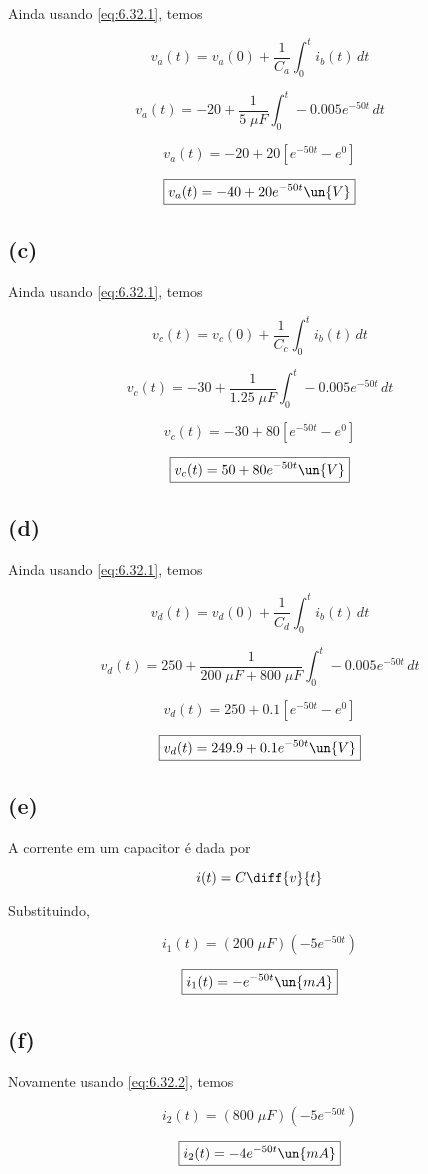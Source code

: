 Ainda usando \eqref{eq:6.32.1}, temos 

\[ v_a(t) = v_a(0) + \frac{1}{C_{a}} \int_{0}^{t} i_b(t) \,dt \]

\[ v_a(t) = -20 + \frac{1}{5 \;\mu F} \int_{0}^{t} -0.005e^{-50t} \,dt \]

\[ v_a(t) = -20 + 20 \left[e^{-50t} - e^0\right] \]

\[ \boxed{v_a(t) = -40 + 20e^{-50t} \un{V}}  \]

\subsection*{(c)}

Ainda usando \eqref{eq:6.32.1}, temos 

\[ v_c(t) = v_c(0) + \frac{1}{C_{c}} \int_{0}^{t} i_b(t) \,dt \]

\[ v_c(t) = -30 + \frac{1}{1.25 \;\mu F} \int_{0}^{t} -0.005e^{-50t} \,dt \]

\[ v_c(t) = -30 + 80 \left[e^{-50t} - e^0\right] \]

\[ \boxed{v_c(t) = 50 + 80e^{-50t} \un{V}}  \]

\subsection*{(d)}

Ainda usando \eqref{eq:6.32.1}, temos 

\[ v_d(t) = v_d(0) + \frac{1}{C_{d}} \int_{0}^{t} i_b(t) \,dt \]

\[ v_d(t) = 250 + \frac{1}{200 \;\mu F + 800 \;\mu F} \int_{0}^{t} -0.005e^{-50t} \,dt \]

\[ v_d(t) = 250 + 0.1 \left[e^{-50t} - e^0\right] \]

\[ \boxed{v_d(t) = 249.9 + 0.1e^{-50t} \un{V}}  \]

\subsection*{(e)}

A corrente em um capacitor é dada por

\begin{equation}\label{eq:6.32.2}
    i(t) = C\diff{v}{t}
\end{equation}

Substituindo,

\[ i_1(t) = (200\;\mu F)(-5e^{-50t}) \]

\[ \boxed{i_1(t) = - e^{-50t} \un{mA}}  \]

\subsection*{(f)}

Novamente usando \eqref{eq:6.32.2}, temos

\[ i_2(t) = (800\;\mu F)(-5e^{-50t}) \]

\[ \boxed{i_2(t) = - 4e^{-50t} \un{mA}}  \]

